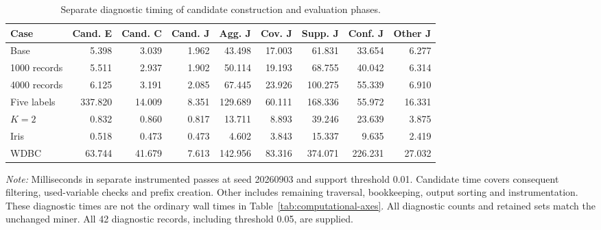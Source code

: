 \begin{table}[t]
\centering\color{red}
\caption{Separate diagnostic timing of candidate construction and evaluation phases.}
\label{tab:candidate-phases}
\begin{tabular}{lrrrrrrrr}
\toprule
Case & Cand. E & Cand. C & Cand. J & Agg. J & Cov. J & Supp. J & Conf. J & Other J \\
\midrule
Base & 5.398 & 3.039 & 1.962 & 43.498 & 17.003 & 61.831 & 33.654 & 6.277 \\
1000 records & 5.511 & 2.937 & 1.902 & 50.114 & 19.193 & 68.755 & 40.042 & 6.314 \\
4000 records & 6.125 & 3.191 & 2.085 & 67.445 & 23.926 & 100.275 & 55.339 & 6.910 \\
Five labels & 337.820 & 14.009 & 8.351 & 129.689 & 60.111 & 168.336 & 55.972 & 16.331 \\
$K=2$ & 0.832 & 0.860 & 0.817 & 13.711 & 8.893 & 39.246 & 23.639 & 3.875 \\
Iris & 0.518 & 0.473 & 0.473 & 4.602 & 3.843 & 15.337 & 9.635 & 2.419 \\
WDBC & 63.744 & 41.679 & 7.613 & 142.956 & 83.316 & 374.071 & 226.231 & 27.032 \\
\bottomrule
\end{tabular}
\par\vspace{0.4ex}\footnotesize\emph{Note:} Milliseconds in separate instrumented passes at seed 20260903 and support threshold 0.01. Candidate time covers consequent filtering, used-variable checks and prefix creation. Other includes remaining traversal, bookkeeping, output sorting and instrumentation. These diagnostic times are not the ordinary wall times in Table~\ref{tab:computational-axes}. All diagnostic counts and retained sets match the unchanged miner. All 42 diagnostic records, including threshold 0.05, are supplied.
\end{table}
